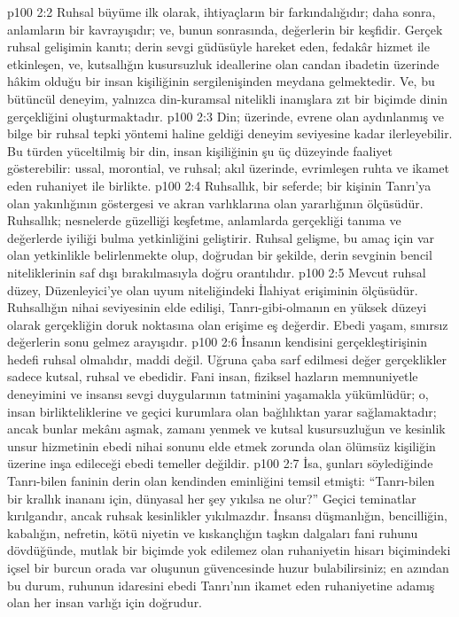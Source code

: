 \vs p100 2:2 Ruhsal büyüme ilk olarak, ihtiyaçların bir farkındalığıdır; daha sonra, anlamların bir kavrayışıdır; ve, bunun sonrasında, değerlerin bir keşfidir. Gerçek ruhsal gelişimin kanıtı; derin sevgi güdüsüyle hareket eden, fedakâr hizmet ile etkinleşen, ve, kutsallığın kusursuzluk ideallerine olan candan ibadetin üzerinde hâkim olduğu bir insan kişiliğinin sergilenişinden meydana gelmektedir. Ve, bu bütüncül deneyim, yalnızca din\hyp{}kuramsal nitelikli inanışlara zıt bir biçimde dinin gerçekliğini oluşturmaktadır.
\vs p100 2:3 Din; üzerinde, evrene olan aydınlanmış ve bilge bir ruhsal tepki yöntemi haline geldiği deneyim seviyesine kadar ilerleyebilir. Bu türden yüceltilmiş bir din, insan kişiliğinin şu üç düzeyinde faaliyet gösterebilir: ussal, morontial, ve ruhsal; akıl üzerinde, evrimleşen ruhta ve ikamet eden ruhaniyet ile birlikte.
\vs p100 2:4 Ruhsallık, bir seferde; bir kişinin Tanrı’ya olan yakınlığının göstergesi ve akran varlıklarına olan yararlığının ölçüsüdür. Ruhsallık; nesnelerde güzelliği keşfetme, anlamlarda gerçekliği tanıma ve değerlerde iyiliği bulma yetkinliğini geliştirir. Ruhsal gelişme, bu amaç için var olan yetkinlikle belirlenmekte olup, doğrudan bir şekilde, derin sevginin bencil niteliklerinin saf dışı bırakılmasıyla doğru orantılıdır.
\vs p100 2:5 Mevcut ruhsal düzey, Düzenleyici’ye olan uyum niteliğindeki İlahiyat erişiminin ölçüsüdür. Ruhsallığın nihai seviyesinin elde edilişi, Tanrı\hyp{}gibi\hyp{}olmanın en yüksek düzeyi olarak gerçekliğin doruk noktasına olan erişime eş değerdir. Ebedi yaşam, sınırsız değerlerin sonu gelmez arayışıdır.
\vs p100 2:6 İnsanın kendisini gerçekleştirişinin hedefi ruhsal olmalıdır, maddi değil. Uğruna çaba sarf edilmesi değer gerçeklikler sadece kutsal, ruhsal ve ebedidir. Fani insan, fiziksel hazların memnuniyetle deneyimini ve insansı sevgi duygularının tatminini yaşamakla yükümlüdür; o, insan birlikteliklerine ve geçici kurumlara olan bağlılıktan yarar sağlamaktadır; ancak bunlar mekânı aşmak, zamanı yenmek ve kutsal kusursuzluğun ve kesinlik unsur hizmetinin ebedi nihai sonunu elde etmek zorunda olan ölümsüz kişiliğin üzerine inşa edileceği ebedi temeller değildir.
\vs p100 2:7 İsa, şunları söylediğinde Tanrı\hyp{}bilen faninin derin olan kendinden eminliğini temsil etmişti: “Tanrı\hyp{}bilen bir krallık inananı için, dünyasal her şey yıkılsa ne olur?” Geçici teminatlar kırılgandır, ancak ruhsak kesinlikler yıkılmazdır. İnsansı düşmanlığın, bencilliğin, kabalığın, nefretin, kötü niyetin ve kıskançlığın taşkın dalgaları fani ruhunu dövdüğünde, mutlak bir biçimde yok edilemez olan ruhaniyetin hisarı biçimindeki içsel bir burcun orada var oluşunun güvencesinde huzur bulabilirsiniz; en azından bu durum, ruhunun idaresini ebedi Tanrı’nın ikamet eden ruhaniyetine adamış olan her insan varlığı için doğrudur.
